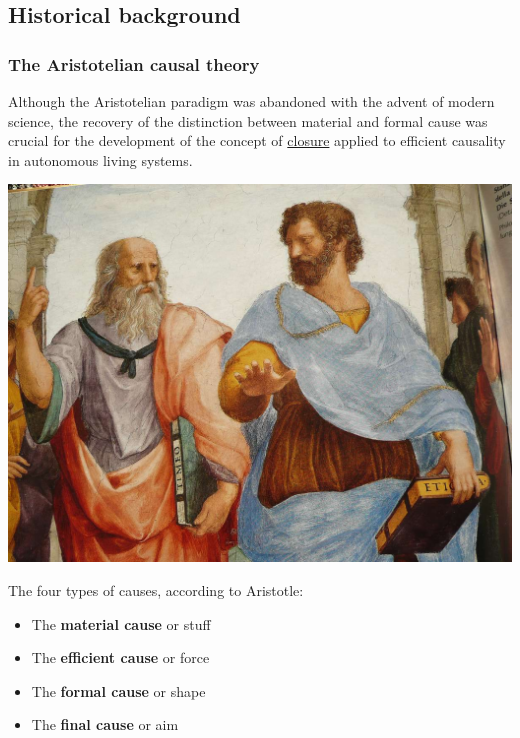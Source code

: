
\subsection{Historical background}

\begin{frame}

\frametitle{The Aristotelian causal theory}

Although the Aristotelian paradigm was abandoned with the advent of modern science, the recovery of the distinction between material and formal cause was crucial for the development of the concept of \href{http://en.wikipedia.org/wiki/Closure_(mathematics)}{closure} applied to efficient causality in autonomous living systems.

	
\begin{center}
\includegraphics[width=3 cm]{fig/aristotle.jpg}

\end{center}
The four types of causes, according to Aristotle:	
 \begin{itemize}
  \item The \textbf{material cause} or stuff
  \item The \textbf{efficient cause} or force
  \item The \textbf{formal cause} or shape
  \item The \textbf{final cause} or aim
  \end{itemize}
\end{frame}




